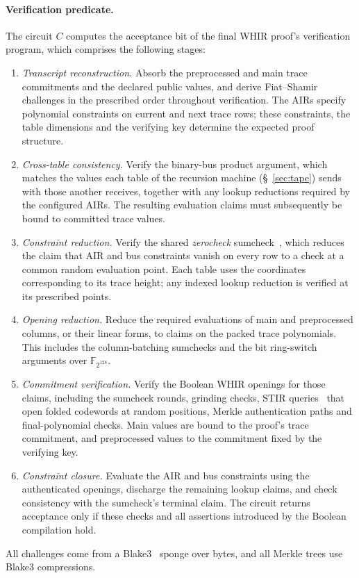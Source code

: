 \documentclass[11pt]{article}
\newcommand{\F}{\mathbb{F}_{2^{128}}}
\begin{document}
\paragraph{Verification predicate.} The circuit $C$ computes the acceptance
bit of the final WHIR proof's verification program, which comprises the
following stages:
\begin{enumerate}
  \item \emph{Transcript reconstruction.} Absorb the preprocessed and main
    trace commitments and the declared public values, and derive Fiat--Shamir
    challenges in the prescribed order throughout verification. The AIRs
    specify polynomial constraints on
    current and next trace rows; these constraints, the table dimensions
    and the verifying key determine the expected proof structure.
  \item \emph{Cross-table consistency.} Verify the binary-bus product argument, which matches the values each table of the recursion machine (\S~\ref{sec:tape}) sends with those another receives, together with any lookup
    reductions required by the configured AIRs. The resulting evaluation
    claims must subsequently be bound to committed trace values.
  \item \emph{Constraint reduction.} Verify the shared \emph{zerocheck}
    sumcheck~\cite{hyperplonk23,lfkn92}, which reduces the claim that AIR
    and bus constraints vanish on every row to a check at a common random
    evaluation point. Each table uses the coordinates corresponding to its trace height;
    any indexed lookup reduction is verified at its prescribed points.
  \item \emph{Opening reduction.} Reduce the required evaluations of main
    and preprocessed columns, or their linear forms, to claims on the packed
    trace polynomials. This includes the column-batching sumchecks and the
    bit ring-switch arguments over $\F$.
  \item \emph{Commitment verification.} Verify the Boolean WHIR openings
    for those claims, including the sumcheck rounds, grinding checks, STIR
    queries~\cite{stir24} that open folded codewords at random positions,
    Merkle authentication paths and final-polynomial checks. Main
    values are bound to the proof's trace commitment, and preprocessed values
    to the commitment fixed by the verifying key.
  \item \emph{Constraint closure.} Evaluate the AIR and bus constraints
    using the authenticated openings, discharge the remaining lookup claims,
    and check consistency with the sumcheck's terminal claim. The circuit
    returns acceptance only if these checks and all assertions introduced by
    the Boolean compilation hold.
\end{enumerate}
All challenges come from a Blake3~\cite{blake3spec} sponge over bytes, and all
Merkle trees use Blake3 compressions.
\end{document}

